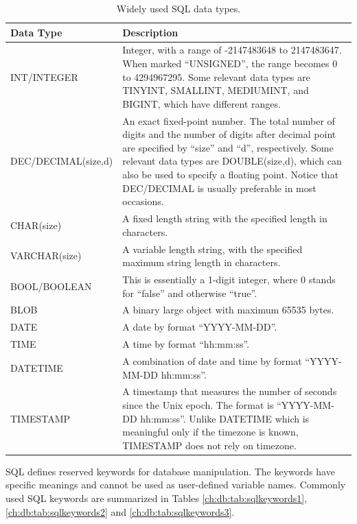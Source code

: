 \begin{table}
	\centering \caption{Widely used SQL data types.}\label{ch:db:tab:sqldatatypes}
	\begin{tabularx}{\textwidth}{lX}
		\hline
		Data Type & Description \\ \hline
		INT/INTEGER & Integer, with a range of -2147483648 to 2147483647. When marked ``UNSIGNED'', the range becomes 0 to 4294967295. Some relevant data types are TINYINT, SMALLINT, MEDIUMINT, and BIGINT, which have different ranges. \\ \hdashline
		DEC/DECIMAL(size,d) & An exact fixed-point number. The total number of digits and the number of digits after decimal point are specified by ``size'' and ``d'', respectively. Some relevant data types are DOUBLE(size,d), which can also be used to specify a floating point. Notice that DEC/DECIMAL is usually preferable in most occasions. \\ \hdashline
		CHAR(size) & A fixed length string with the specified length in characters. \\ \hdashline
		VARCHAR(size) & A variable length string, with the specified maximum string length in characters. \\ \hdashline
		BOOL/BOOLEAN & This is essentially a 1-digit integer, where 0 stands for ``false'' and otherwise ``true''. \\ \hdashline
		BLOB & A binary large object with maximum 65535 bytes. \\ \hdashline
		DATE & A date by format ``YYYY-MM-DD''. \\ \hdashline
		TIME & A time by format ``hh:mm:ss''. \\ \hdashline
		DATETIME & A combination of date and time by format ``YYYY-MM-DD hh:mm:ss''. \\ \hdashline
		TIMESTAMP & A timestamp that measures the number of seconds since the Unix epoch. The format is ``YYYY-MM-DD hh:mm:ss''. Unlike DATETIME which is meaningful only if the timezone is known, TIMESTAMP does not rely on timezone. \\ \hline
	\end{tabularx}
\end{table}

SQL defines reserved keywords for database manipulation. The keywords have specific meanings and cannot be used as user-defined variable names. Commonly used SQL keywords are summarized in Tables \ref{ch:db:tab:sqlkeywords1}, \ref{ch:db:tab:sqlkeywords2} and \ref{ch:db:tab:sqlkeywords3}.

